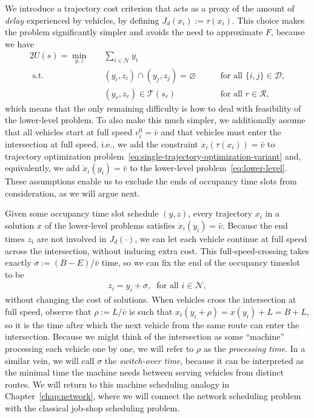 \documentclass[a4paper]{report}
\theoremstyle{definition}
\theoremstyle{plain}
\begin{document}
We introduce a trajectory cost criterion that acts as a proxy of the amount of
\emph{delay} experienced by vehicles, by defining $J_d(x_{i}) := \tau(x_{i})$.
%
This choice makes the problem significantly simpler and avoids the need to
approximate $F$, because we have
\begin{alignat}{2}
  U(s) = \min_{y, z} \quad & \sum_{i \in \mathcal{N}} y_{i} \nonumber \\
  \text{ s.t. } \quad & (y_{i},z_{i}) \cap (y_{j},z_{j}) = \varnothing && \quad \text{ for all } \{i, j\} \in \mathcal{D} , \nonumber \\
                           & ({y}_{r}, {z}_{r}) \in \mathcal{T}(s_{r}) && \quad \text{ for all } r \in \mathcal{R} , \nonumber
\end{alignat}
which means that the only remaining difficulty is how to deal with feasibility
of the lower-level problem.
%
To also make this much simpler, we additionally assume that all vehicles start
at full speed $v_{i}^{0} = \bar{v}$ and that vehicles must enter the
intersection at full speed, i.e., we add the constraint
$\dot{x}_{i}(\tau(x_{i})) = \bar{v}$ to trajectory optimization problem~\eqref{eq:single-trajectory-optimization-variant} and,
equivalently, we add $\dot{x}_{i}(y_{i}) = \bar{v}$ to the lower-level
problem~\eqref{eq:lower-level}.
%
These assumptions enable us to exclude the ends of occupancy time slots from
consideration, as we will argue next.

Given some occupancy time slot schedule $(y,z)$, every trajectory $x_{i}$ in a
solution $x$ of the lower-level problems satisfies
$\dot{x}_{i}(y_{i}) = \bar{v}$.
%
Because the end times $z_{i}$ are not involved in $J_d(\cdot)$, we can let each
vehicle continue at full speed across the intersection, without inducing extra
cost. This full-speed-crossing takes exactly $\sigma := (B-E)/\bar{v}$ time, so we
can fix the end of the occupancy timeslot to be
\begin{align*}
  z_{i} = y_{i} + \sigma, \; \text{ for all } i \in \mathcal{N} ,
\end{align*}
without changing the cost of solutions.
%
When vehicles cross the intersection at full speed, observe that
$\rho := L / \bar{v}$ is such that $x_{i}(y_i + \rho) = x(y_{i}) + L = B + L$, so it
is the time after which the next vehicle from the same route can enter the
intersection. Because we might think of the intersection as some ``machine''
processing each vehicle one by one, we will refer to $\rho$ as the \textit{processing time}.
%
In a similar vein, we will call $\sigma$ the \emph{switch-over time}, because it
can be interpreted as the minimal time the machine needs between serving
vehicles from distinct routes.
%
We will return to this machine scheduling analogy in Chapter~\ref{chap:network},
where we will connect the network scheduling problem with the classical job-shop
scheduling problem.
\end{document}
